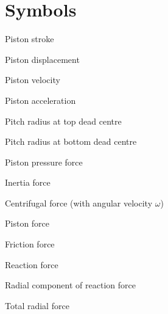 \label{sec:acronyms}

\normalsize  %

\section*{Symbols}
\begin{description}[style=multiline, leftmargin=3.5cm, labelwidth=3.2cm]
    \item[$h_k$] Piston stroke
    \item[$s_k$] Piston displacement
    \item[$v_k$] Piston velocity
    \item[$a_k$] Piston acceleration
    \item[$r_{\text{max}}$] Pitch radius at top dead centre
    \item[$r_{\text{min}}$] Pitch radius at bottom dead centre
    \item[$F_{\text{DK}}$] Piston pressure force
    \item[$F_i$] Inertia force
    \item[$F_{\omega K}$] Centrifugal force (with angular velocity $\omega$)
    \item[$F_{\text{AK}}$] Piston force
    \item[$F_{\text{TK}}$] Friction force
    \item[$F_{\text{SK}}$] Reaction force
    \item[$F_{\text{SKy}}$] Radial component of reaction force
    \item[$F_{\text{querkraft}}$] Total radial force
\end{description}
